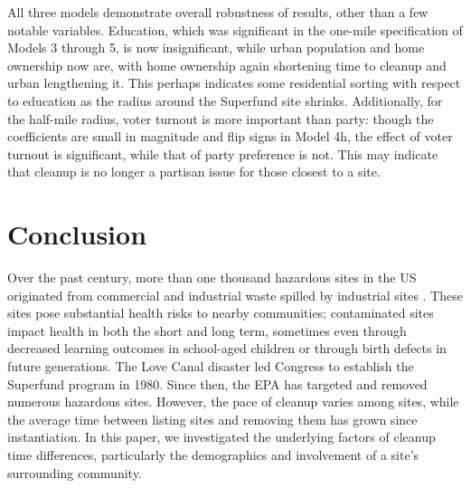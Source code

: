 \documentclass[12pt]{article}
\begin{document}
All three models demonstrate overall robustness of results, other than a few notable variables. Education, which was significant in the one-mile specification of Models 3 through 5, is now insignificant, while urban population and home ownership now are, with home ownership again shortening time to cleanup and urban lengthening it. This perhaps indicates some residential sorting with respect to education as the radius around the Superfund site shrinks. Additionally, for the half-mile radius, voter turnout is more important than party: though the coefficients are small in magnitude and flip signs in Model 4h, the effect of voter turnout is significant, while that of party preference is not. This may indicate that cleanup is no longer a partisan issue for those closest to a site.

\section{Conclusion}\label{conc}

Over the past century, more than one thousand hazardous sites in the US originated from commercial and industrial waste spilled by industrial sites \parencite{EPA2011}. These sites pose substantial health risks to nearby communities; contaminated sites impact health in both the short and long term, sometimes even through decreased learning outcomes in school-aged children \parencite{Pastor2004} or through birth defects in future generations. The Love Canal disaster led Congress to establish the Superfund program in 1980. Since then, the EPA has targeted and removed numerous hazardous sites. However, the pace of cleanup varies among sites, while the average time between listing sites and removing them has grown since instantiation. In this paper, we investigated the underlying factors of cleanup time differences, particularly the demographics and involvement of a site's surrounding community. 
\end{document}
